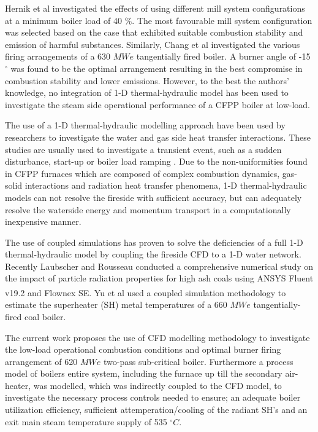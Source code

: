 \documentclass[review]{elsarticle}
\begin{document}
Hernik et al \cite{Hernik2020} investigated the effects of using different mill system configurations at a minimum boiler load of 40 $\%$. The most favourable mill system configuration was selected based on the case that exhibited suitable combustion stability and emission of harmful substances. Similarly, Chang et al \citep{Chang2021} investigated the various firing arrangements of a 630 $MWe$ tangentially fired boiler. A burner angle of -15 $^\circ$ was found to be the optimal arrangement resulting in the best compromise in combustion stability and lower emissions. However, to the best the authors' knowledge, no integration of 1-D thermal-hydraulic model has been used to investigate the steam side operational performance of a CFPP boiler at low-load.

The use of a 1-D thermal-hydraulic modelling approach have been used by researchers to investigate the water and gas side heat transfer interactions. These studies are usually used to investigate a transient event, such as a sudden disturbance, start-up or boiler load ramping \cite{Alobaid2017}. Due to the non-uniformities found in CFPP furnaces which are composed of complex combustion dynamics, gas-solid interactions and  radiation heat transfer phenomena, 1-D thermal-hydraulic models can not resolve the fireside with sufficient accuracy, but can adequately resolve the waterside energy and momentum transport in a computationally inexpensive manner. 

The use of coupled simulations has proven to solve the deficiencies of a full 1-D thermal-hydraulic model by coupling the fireside CFD to a 1-D water network. Recently Laubscher and Rousseau \cite{Laubscher2020} conducted a comprehensive numerical study on the impact of particle radiation properties for high ash coals using ANSYS Fluent v19.2\textsuperscript{\textregistered} and Flownex SE\textsuperscript{\textregistered}. Yu et al \cite{Yu2019} used a coupled simulation methodology to estimate the superheater (SH) metal temperatures of a 660 $MWe$ tangentially-fired coal boiler.

The current work proposes the use of CFD modelling methodology to investigate the low-load operational combustion conditions and optimal burner firing arrangement of 620 $MWe$ two-pass sub-critical boiler. Furthermore a process model of boilers entire system, including the furnace up till the secondary air-heater, was modelled, which was indirectly coupled to the CFD model, to investigate the necessary process controls needed to ensure; an adequate boiler utilization efficiency, sufficient attemperation/cooling of the radiant SH's and an exit main steam temperature supply of 535 $^\circ C$. 
\end{document}
